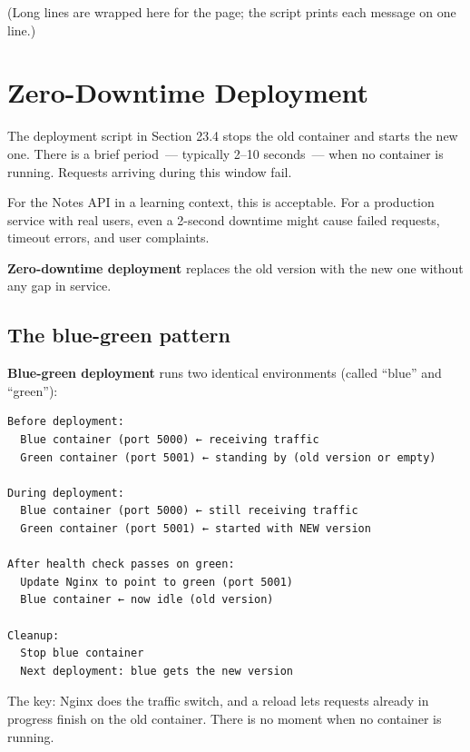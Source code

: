 \noindent{}(Long lines are wrapped here for the page; the script prints each message on one line.)

\setcounter{section}{4}
\section{Zero-Downtime Deployment}\label{23-code-transfer:235-zero-downtime-deployment}

The deployment script in Section 23.4 stops the old container and starts the new one. There is a brief period~--- typically 2--10 seconds~--- when no container is running. Requests arriving during this window fail.

For the Notes API in a learning context, this is acceptable. For a production service with real users, even a 2-second downtime might cause failed requests, timeout errors, and user complaints.

\textbf{Zero-downtime deployment} replaces the old version with the new one without any gap in service.

\subsection*{The blue-green pattern}\label{23-code-transfer:the-blue-green-pattern}

\textbf{Blue-green deployment} runs two identical environments (called ``blue'' and ``green''):

\begin{outputbox}[short]
\begin{Verbatim}[fontsize=\codesize, breaklines, breakanywhere, breaksymbolleft={\tiny\textcolor{muted}{$\hookrightarrow$}}]
Before deployment:
  Blue container (port 5000) ← receiving traffic
  Green container (port 5001) ← standing by (old version or empty)

During deployment:
  Blue container (port 5000) ← still receiving traffic
  Green container (port 5001) ← started with NEW version

After health check passes on green:
  Update Nginx to point to green (port 5001)
  Blue container ← now idle (old version)

Cleanup:
  Stop blue container
  Next deployment: blue gets the new version
\end{Verbatim}
\end{outputbox}

\noindent{}The key: Nginx does the traffic switch, and a reload lets requests already in progress finish on the old container. There is no moment when no container is running.

